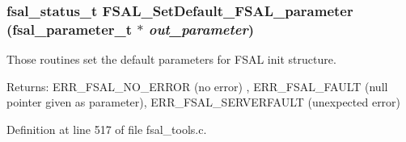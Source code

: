 \subsubsection[{FSAL\_\-SetDefault\_\-FSAL\_\-parameter}]{\setlength{\rightskip}{0pt plus 5cm}fsal\_\-status\_\-t FSAL\_\-SetDefault\_\-FSAL\_\-parameter (fsal\_\-parameter\_\-t $\ast$ {\em out\_\-parameter})}\label{fsal__tools_8c_a4c8e7706d68c7f776c02726c89dc8d0}


Those routines set the default parameters for FSAL init structure. \begin{Desc}
\item[Returns:]ERR\_\-FSAL\_\-NO\_\-ERROR (no error) , ERR\_\-FSAL\_\-FAULT (null pointer given as parameter), ERR\_\-FSAL\_\-SERVERFAULT (unexpected error) \end{Desc}


Definition at line 517 of file fsal\_\-tools.c.